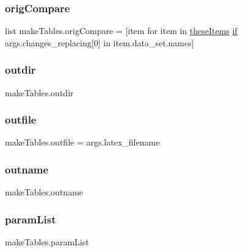 \subsubsection{\texorpdfstring{orig\+Compare}{origCompare}}
{\footnotesize\ttfamily list make\+Tables.\+orig\+Compare = \mbox{[}item for item in \mbox{\hyperlink{namespacemakeTables_a86cc3672f98bbfb5411b7d0fc643f57d}{these\+Items}} \mbox{\hyperlink{plotTT_8m_a722e57dd98d67aec0b3589ce8efff8bb}{if}} args.\+changes\+\_\+replacing\mbox{[}0\mbox{]} in item.\+data\+\_\+set.\+names\mbox{]}}

\mbox{\label{namespacemakeTables_a9de2c41c96b8a31c4be31b641f2f8831}} 
\subsubsection{\texorpdfstring{outdir}{outdir}}
{\footnotesize\ttfamily make\+Tables.\+outdir}

\mbox{\label{namespacemakeTables_a5b2a60e5426f013550a0491f01657fdb}} 
\subsubsection{\texorpdfstring{outfile}{outfile}}
{\footnotesize\ttfamily make\+Tables.\+outfile = args.\+latex\+\_\+filename}

\mbox{\label{namespacemakeTables_a2beb919bb42e482900accc9ed7481ccc}} 
\subsubsection{\texorpdfstring{outname}{outname}}
{\footnotesize\ttfamily make\+Tables.\+outname}

\mbox{\label{namespacemakeTables_a2862558f8e3b6ae1cf6624f2fcbfaaa1}} 
\subsubsection{\texorpdfstring{param\+List}{paramList}}
{\footnotesize\ttfamily make\+Tables.\+param\+List}

